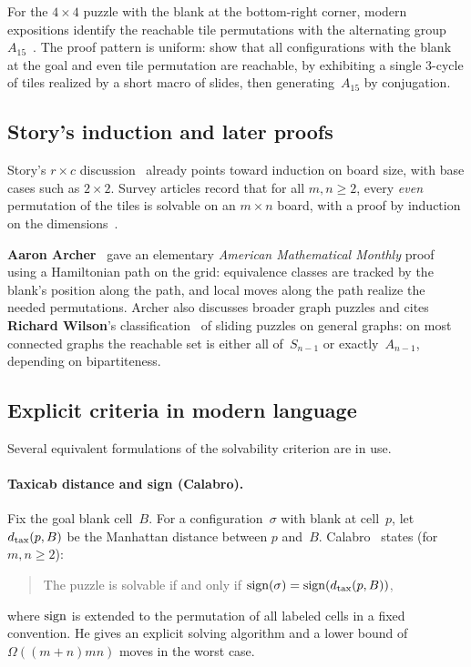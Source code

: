 For the $4\times 4$ puzzle with the blank at the bottom-right corner, modern expositions identify the reachable tile permutations with the alternating group~$A_{15}$~\cite{Conrad15Puzzle,BeelerFifteen,LimMIT2018}.
The proof pattern is uniform: show that all configurations with the blank at the goal and even tile permutation are reachable, by exhibiting a single $3$-cycle of tiles realized by a short macro of slides, then generating~$A_{15}$ by conjugation.

\subsection{Story's induction and later proofs}

Story's $r\times c$ discussion~\cite{JohnsonStory1879} already points toward induction on board size, with base cases such as $2\times 2$.
Survey articles record that for all $m,n\ge 2$, every \emph{even} permutation of the tiles is solvable on an $m\times n$ board, with a proof by induction on the dimensions~\cite{Wikipedia15Puzzle}.

\textbf{Aaron Archer}~\cite{Archer1999} gave an elementary \emph{American Mathematical Monthly} proof using a Hamiltonian path on the grid: equivalence classes are tracked by the blank's position along the path, and local moves along the path realize the needed permutations.
Archer also discusses broader graph puzzles and cites \textbf{Richard Wilson}'s classification~\cite{Wilson1974} of sliding puzzles on general graphs: on most connected graphs the reachable set is either all of~$S_{n-1}$ or exactly~$A_{n-1}$, depending on bipartiteness.

\subsection{Explicit criteria in modern language}

Several equivalent formulations of the solvability criterion are in use.

\paragraph{Taxicab distance and sign (Calabro).}
Fix the goal blank cell~$B$.
For a configuration~$\sigma$ with blank at cell~$p$, let $d_{\mathrm{tax}}(p,B)$ be the Manhattan distance between $p$ and~$B$.
Calabro~\cite{Calabro15Puzzle} states (for $m,n\ge 2$):
\begin{quote}
  The puzzle is solvable if and only if $\operatorname{sign}(\sigma) = \operatorname{sign}(d_{\mathrm{tax}}(p,B))$,
\end{quote}
where $\operatorname{sign}$ is extended to the permutation of all labeled cells in a fixed convention.
He gives an explicit solving algorithm and a lower bound of $\Omega((m+n)mn)$ moves in the worst case.

